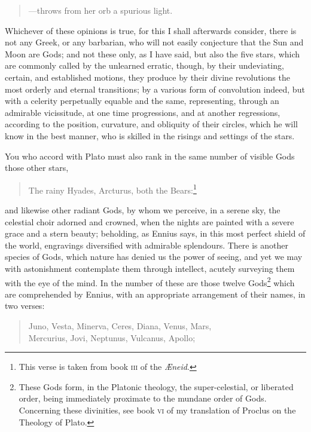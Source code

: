\documentclass[12pt]{article}
\begin{document}
\begin{verse}
---throws from her orb a spurious light. 
\end{verse}

\noindent Whichever of these opinions is true, for this I shall afterwards
consider, there is not any Greek, or any barbarian, who will not easily
conjecture that the Sun and Moon are Gods; and not these only, as I have said,
but also the five stars, which are commonly called by the unlearned erratic,
though, by their undeviating, certain, and established motions, they produce by
their divine revolutions the most orderly and eternal transitions; by a various
form of convolution indeed, but with a celerity perpetually equable and the
same, representing, through an admirable vicissitude, at one time progressions,
and at another regressions, according to the position, curvature, and obliquity
of their circles, which he will know in the best manner, who is skilled in the
risings and settings of the stars.

You who accord with Plato must also rank in the same number of visible Gods
those other stars,

\begin{verse}
The rainy Hyades, Arcturus, both the Bears:\footnote{This verse is taken from
book \textsc{iii} of the \textit{{\AE}neid}.}
\end{verse}

\noindent and likewise other radiant Gods, by whom we perceive, in a serene
sky, the celestial choir adorned and crowned, when the nights are painted with
a severe grace and a stern beauty; beholding, as Ennius says, in this most
perfect shield of the world, engravings diversified with admirable splendours.
There is another species of Gods, which nature has denied us the power of
seeing, and yet we may with astonishment contemplate them through intellect,
acutely surveying them with the eye of the mind. In the number of these are
those twelve Gods\footnote{These Gods form, in the Platonic theology, the
super-celestial, or liberated order, being immediately proximate to the mundane
order of Gods. Concerning these divinities, see book \textsc{vi} of my
translation of Proclus on the Theology of Plato.} which are comprehended by
Ennius, with an appropriate arrangement of their names, in two verses:

\begin{verse}
Juno, Vesta, Minerva, Ceres, Diana, Venus, Mars,\\
Mercurius, Jovi, Neptunus, Vulcanus, Apollo;
\end{verse}
\end{document}

